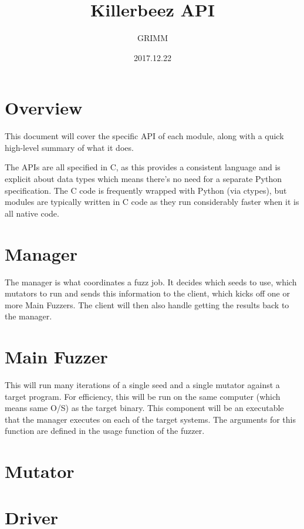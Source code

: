\documentclass{article}
\title{Killerbeez API}
\author{GRIMM}
\date{2017.12.22}
\begin{document}
\thispagestyle{empty}
\maketitle
\newpage

\tableofcontents
\newpage

\section{Overview}
This document will cover the specific API of each module, along with a quick
high-level summary of what it does.

\par
The APIs are all specified in C, as this provides a consistent language and is
explicit about data types which means there's no need for a separate Python
specification.  The C code is frequently wrapped with Python (via ctypes), but
modules are typically written in C code as they run considerably faster when
it is all native code.

\section{Manager}
The manager is what coordinates a fuzz job.  It decides which seeds to use,
which mutators to run and sends this information to the client, which kicks
off one or more Main Fuzzers.  The client will then also handle getting the
results back to the manager.

\section{Main Fuzzer}
This will run many iterations of a single seed and a single mutator against a
target program.  For efficiency, this will be run on the same computer (which
means same O/S) as the target binary.  This component will be an executable that
the manager executes on each of the target systems.  The arguments for this
function are defined in the usage function of the fuzzer.

\section{Mutator}
\label{mutator}


\section{Driver}
\label{driver}

\end{document}
